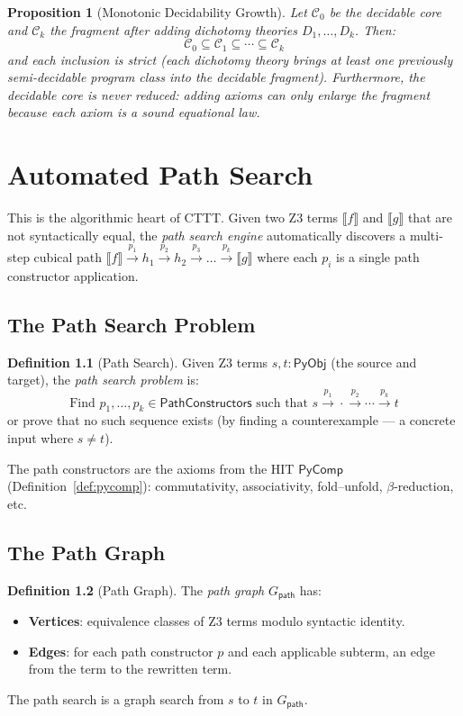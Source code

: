 \documentclass[11pt,a4paper]{report}
\theoremstyle{definition}
\newtheorem{definition}{Definition}[chapter]
\theoremstyle{plain}
\newtheorem{proposition}[definition]{Proposition}
\newcommand{\den}[1]{\llbracket #1 \rrbracket}
\newcommand{\PyObj}{\mathsf{PyObj}}
\begin{document}
\begin{proposition}[Monotonic Decidability Growth]
\label{prop:monotonic-decidability}
Let $\mathcal{C}_0$ be the decidable core and $\mathcal{C}_k$ the
fragment after adding dichotomy theories $D_1, \ldots, D_k$.  Then:
\[
  \mathcal{C}_0 \subseteq \mathcal{C}_1 \subseteq \cdots
    \subseteq \mathcal{C}_k
\]
and each inclusion is strict (each dichotomy theory brings at least
one previously semi-decidable program class into the decidable
fragment).  Furthermore, the decidable core is \emph{never}
reduced: adding axioms can only enlarge the fragment because each
axiom is a sound equational law.
\end{proposition}


\chapter{Automated Path Search}
\label{ch:path-search}

This is the algorithmic heart of CTTT.  Given two Z3 terms $\den{f}$
and $\den{g}$ that are not syntactically equal, the \emph{path search
engine} automatically discovers a multi-step cubical path
$\den{f} \xrightarrow{p_1} h_1 \xrightarrow{p_2} h_2
\xrightarrow{p_3} \ldots \xrightarrow{p_k} \den{g}$
where each $p_i$ is a single path constructor application.

\section{The Path Search Problem}

\begin{definition}[Path Search]
Given Z3 terms $s, t : \PyObj$ (the source and target), the
\emph{path search problem} is:
\[
  \text{Find } p_1, \ldots, p_k \in \mathsf{PathConstructors}
  \text{ such that } s \xrightarrow{p_1} \cdot \xrightarrow{p_2}
  \cdots \xrightarrow{p_k} t
\]
or prove that no such sequence exists (by finding a
counterexample --- a concrete input where $s \neq t$).
\end{definition}

The path constructors are the axioms from the HIT $\mathsf{PyComp}$
(Definition~\ref{def:pycomp}): commutativity, associativity,
fold--unfold, $\beta$-reduction, etc.

\section{The Path Graph}

\begin{definition}[Path Graph]
The \emph{path graph} $G_\mathsf{path}$ has:
\begin{itemize}
  \item \textbf{Vertices}: equivalence classes of Z3 terms modulo
    syntactic identity.
  \item \textbf{Edges}: for each path constructor $p$ and each
    applicable subterm, an edge from the term to the rewritten term.
\end{itemize}
The path search is a graph search from $s$ to $t$ in $G_\mathsf{path}$.
\end{definition}
\end{document}
